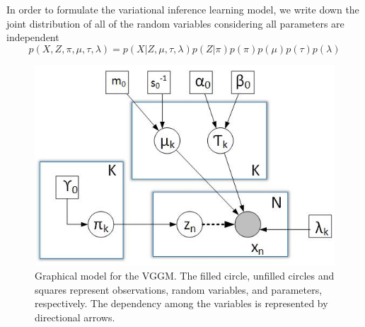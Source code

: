 \documentclass[conference]{IEEEtran}
\begin{document}

    

    In order to formulate  the variational inference learning model, we write down
the joint distribution of all of the random variables considering all parameters are independent 
\begin{equation}
    p(X, Z, \pi, \mu, \tau, \lambda) = p(X|Z, \mu, \tau, \lambda)p(Z|\pi)p(\pi)p(\mu)p(\tau)p(\lambda)
\end{equation}
\begin{figure}[h!]
    \begin{center}
        \includegraphics[width=0.7\linewidth]{imgresults/model.jpeg}
        \caption{Graphical model for the VGGM. 
        The filled circle, unfilled circles and squares represent observations, random variables, and parameters, respectively. The dependency among the variables is represented by directional arrows.}
        \label{VGGM Graphical Model}    
    \end{center}
\end{figure}
\end{document}
